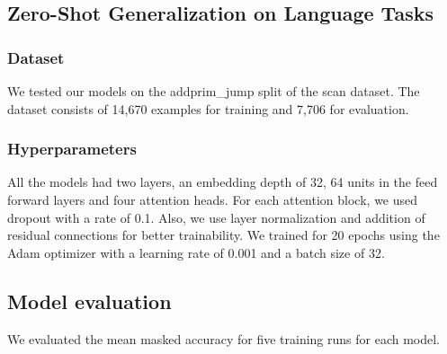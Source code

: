 \subsection{Zero-Shot Generalization on Language Tasks}
\subsubsection{Dataset}
We tested our models on the addprim\_jump split of the scan \textcite{lake_generalization_2018} dataset. The dataset consists of 14,670 examples for training and 7,706 for evaluation.
\subsubsection{Hyperparameters}
All the models had two layers, an embedding depth of 32, 64 units in the feed forward layers and four attention heads. For each attention block, we used dropout with a rate of 0.1. Also, we use layer normalization and addition of residual connections for better trainability. \newline
We trained for 20 epochs using the Adam \textcite{kingma_adam_2017} optimizer with a learning rate of 0.001 and a batch size of 32.
\subsection{Model evaluation}
We evaluated the mean masked accuracy for five training runs for each model.